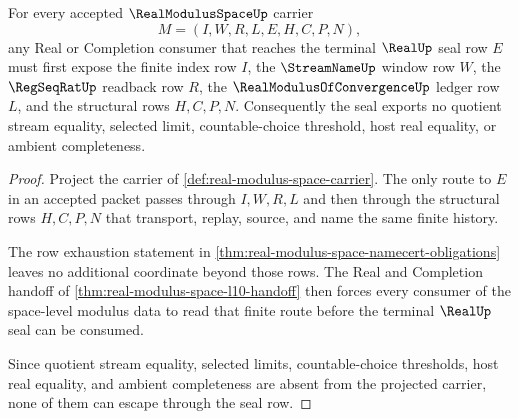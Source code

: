\begin{theorem}
\label{thm:real-modulus-space-real-seal-nonescape}
For every accepted $\RealModulusSpaceUp$ carrier
$$
M=(I,W,R,L,E,H,C,P,N),
$$
any Real or Completion consumer that reaches the terminal $\RealUp$ seal row
$E$ must first expose the finite index row $I$, the $\StreamNameUp$ window row
$W$, the $\RegSeqRatUp$ readback row $R$, the
$\RealModulusOfConvergenceUp$ ledger row $L$, and the structural rows
$H,C,P,N$. Consequently the seal exports no quotient stream equality, selected
limit, countable-choice threshold, host real equality, or ambient
completeness.
\end{theorem}
\begin{proof}
Project the carrier of \autoref{def:real-modulus-space-carrier}. The only
route to $E$ in an accepted packet passes through $I,W,R,L$ and then through
the structural rows $H,C,P,N$ that transport, replay, source, and name the same
finite history.

The row exhaustion statement in
\autoref{thm:real-modulus-space-namecert-obligations} leaves no additional
coordinate beyond those rows. The Real and Completion handoff of
\autoref{thm:real-modulus-space-l10-handoff} then forces every consumer of the
space-level modulus data to read that finite route before the terminal
$\RealUp$ seal can be consumed.

Since quotient stream equality, selected limits, countable-choice thresholds,
host real equality, and ambient completeness are absent from the projected
carrier, none of them can escape through the seal row.
\end{proof}




